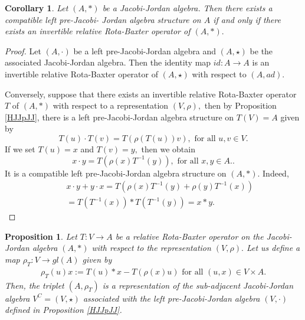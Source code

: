 \documentclass[12pt]{amsart}
\newtheorem{example}[Theorem]{Example}
\newtheorem{proposition}[Theorem]{Proposition}
\newtheorem{corollary}[Theorem]{Corollary}
\begin{document}
\begin{corollary}
	Let $(A,\ast)$ be a Jacobi-Jordan algebra. Then there exists a compatible left pre-Jacobi-
	Jordan algebra structure on $A$ if and only if there exists an invertible relative Rota-Baxter operator of $(A, \ast).$
\end{corollary}
\begin{proof}
	Let $(A,\cdot)$ be a left pre-Jacobi-Jordan algebra and $(A,\star)$ be the associated Jacobi-Jordan
	algebra. Then the identity map $id : A\rightarrow A$ is an invertible relative Rota-Baxter operator of $(A,\star)$ with respect to $(A, ad).$
	
	Conversely, suppose that there exists an invertible relative Rota-Baxter operator $T$ of $(A, \ast)$ with respect 
	to a representation $(V, \rho),$ then by Proposition \ref{HJJpJJ}, there is a left pre-Jacobi-Jordan algebra
	structure on $T(V)=A$ given by
	$$T(u)\cdot T(v)=T(\rho(T(u))v),\mbox{ for all $u, v \in V.$}$$
	If we set $T(u)=x$ and $T(v)=y,$ then we obtain
	$$ x\cdot y=T(\rho(x)T^{-1}(y)), \mbox{ for all $x, y \in A.$}.$$
	It is a compatible left pre-Jacobi-Jordan algebra structure on $(A,\ast).$ Indeed,
	\begin{eqnarray}
		&&x\cdot y+y\cdot x=T(\rho(x)T^{-1}(y)+\rho(y)T^{-1}(x))\nonumber\\
		&&= T(T^{-1}(x))\ast T(T^{-1}(y))=x\ast y.\nonumber
	\end{eqnarray}
\end{proof}
\begin{proposition}
	Let $T : V\rightarrow A$ be a relative Rota-Baxter operator on the Jacobi-Jordan algebra $( A, \ast)$ with respect to the representation $(V,\rho).$
	Let us define a map $\rho_T : V\rightarrow  gl(A)$ given by
	\begin{eqnarray}
		\rho_T(u)x:=T(u)\ast x-T(\rho(x)u) \mbox{ for all $(u,x)\in V\times A $.}\nonumber
	\end{eqnarray}
	Then, the triplet $(A,\rho_T)$ is a representation of the sub-adjacent Jacobi-Jordan algebra $V^C=(V,\star)$ associated with the left pre-Jacobi-Jordan algebra 
	$(V,\cdot)$ defined in Proposition \ref{HJJpJJ}.
\end{proposition}
\end{document}
